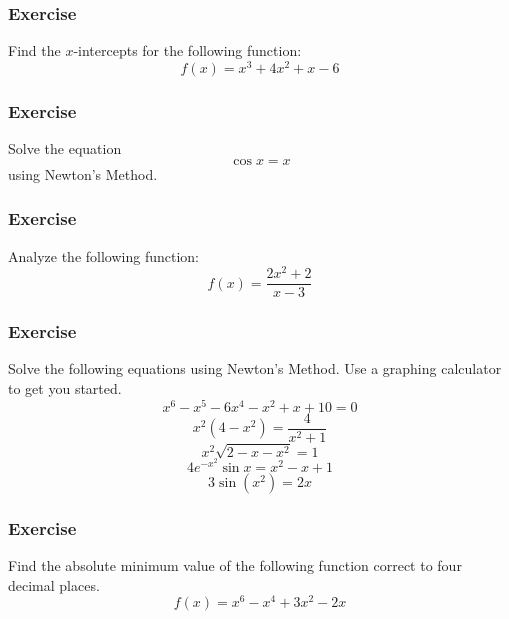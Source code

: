 \documentclass[xcolor=dvipsnames]{beamer}
\begin{document}
\begin{frame}
  \frametitle{Exercise}
{\ubung} Find the $x$-intercepts for the following function:
\begin{equation}
  \label{eq:yiceepuo}
  f(x)=x^{3}+4x^{2}+x-6
\end{equation}
\end{frame}

\begin{frame}
  \frametitle{Exercise}
{\ubung} Solve the equation
\begin{equation}
  \label{eq:puxeepha}
  \cos{}x=x
\end{equation}
using Newton's Method.
\end{frame}

\begin{frame}
  \frametitle{Exercise}
{\ubung} Analyze the following function:
\begin{equation}
  \label{eq:aehoilao}
  f(x)=\frac{2x^{2}+2}{x-3}
\end{equation}
\end{frame}

\begin{frame}
  \frametitle{Exercise}
{\ubung} Solve the following equations using Newton's Method. Use a
graphing calculator to get you started.
\begin{equation}
  \label{eq:xeigheuy}
  x^{6}-x^{5}-6x^{4}-x^{2}+x+10=0
\end{equation}
\begin{equation}
  \label{eq:ohtharoh}
  x^{2}(4-x^{2})=\frac{4}{x^{2}+1}
\end{equation}
\begin{equation}
  \label{eq:iejuangi}
  x^{2}\sqrt{2-x-x^{2}}=1
\end{equation}
\begin{equation}
  \label{eq:oungiegu}
  4e^{-x^{2}}\sin{}x=x^{2}-x+1
\end{equation}
\begin{equation}
  \label{eq:ohpaejae}
  3\sin(x^{2})=2x
\end{equation}
\end{frame}

\begin{frame}
  \frametitle{Exercise}
{\ubung} Find the absolute minimum value of the following function
correct to four decimal places.
\begin{equation}
  \label{eq:veiyeini}
  f(x)=x^{6}-x^{4}+3x^{2}-2x
\end{equation}
\end{frame}
\end{document}
